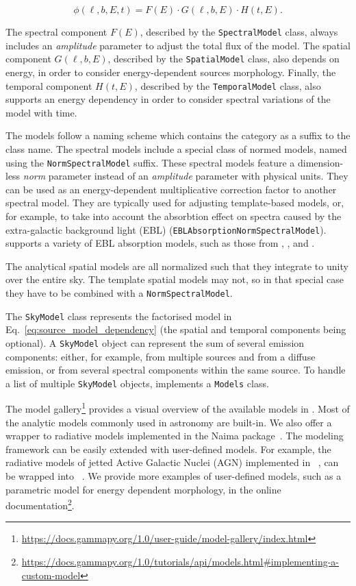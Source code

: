 \documentclass[longauth]{aa}
\newcommand{\code}[1]{\texttt{#1}}
\begin{document}
\begin{equation}
    \phi(\ell, b, E, t) = F(E) \cdot G(\ell, b, E) \cdot H(t, E).
    \label{eq:source_model_dependency}
\end{equation}

The spectral component $F(E)$, described by the \code{SpectralModel} class, always
includes an \textit{amplitude} parameter to adjust the total flux of the model.
The spatial component $G(\ell, b, E)$, described by the \code{SpatialModel} class,
also depends on energy, in order to consider energy-dependent sources morphology.
Finally, the temporal component $H(t, E)$, described by the \code{TemporalModel}
class, also supports an energy dependency in order to consider spectral variations
of the model with time.

The models follow a naming scheme which contains the category as a suffix to
the class name. The spectral models include a special class of normed models,
named using the \code{NormSpectralModel} suffix.
These spectral models feature a dimension-less \textit{norm} parameter
instead of an \textit{amplitude} parameter with physical units. They
can be used as an energy-dependent multiplicative correction
factor to another spectral model. They are typically used for
adjusting template-based models, or, for example, to take into account
the absorbtion effect on \gammaray spectra caused by the extra-galactic background
light (EBL) (\code{EBLAbsorptionNormSpectralModel}). \gammapy supports a variety
of EBL absorption models, such as those from \cite{Franceschini2008, Franceschini2017}, \cite{Finke2010},
and \cite{Dominguez2011}.

The analytical spatial models are all normalized such that they integrate to
unity over the entire sky. The template spatial models may not, so in that special
case they have to be combined with a \code{NormSpectralModel}.

The \code{SkyModel} class represents the factorised model in Eq.~\ref{eq:source_model_dependency}
(the spatial and temporal components being optional).
A \code{SkyModel} object can represent the sum of several emission components:
either, for example, from multiple sources and from a diffuse emission, or from several spectral
components within the same source. To handle a list of multiple \code{SkyModel} objects, \gammapy
implements a \code{Models} class.

The model gallery\footnote{\url{https://docs.gammapy.org/1.0/user-guide/model-gallery/index.html}}
 provides a visual overview of the available models in
\gammapy. Most of the analytic models commonly used in \gammaray astronomy are
built-in. We also offer a wrapper to radiative models implemented in the Naima
package~\citep{naima}. The modeling framework can be easily extended with
user-defined models. For example, the radiative models of jetted Active Galactic Nuclei (AGN)
implemented in \agnpy~\citep{agnpy2022}, can be wrapped into 
\gammapy~\citep[see Section 3.5 of ][]{2022A&A...660A..18N}. We provide 
more examples of user-defined models, such as a parametric model for energy dependent morphology,
in the online documentation\footnote{\url{https://docs.gammapy.org/1.0/tutorials/api/models.html\#implementing-a-custom-model}}.
\end{document}
